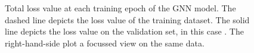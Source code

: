 \documentclass[
	fontsize=10pt, %
	twoside=true, %
	secnumdepth=1, %
  toc=indentunnumbered %
]{kaobook}
\begin{document}
\begin{figure}[h]
  \centering
  \begin{subfigure}[h]{0.49\linewidth}
  \end{subfigure}
  \begin{subfigure}[h]{0.49\linewidth}
  \end{subfigure}
  \caption{Total loss value at each training epoch of the GNN model. The dashed
    line depicts the loss value of the training dataset. The solid line depicts
    the loss value on the validation set, in this case \ReconMap{}. The
    right-hand-side plot a focussed view on the same data.}
  \label{fig:svm-repro-loss}
\end{figure}




\end{document}
